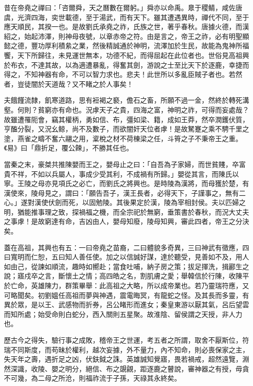 \begin{pinyinscope}
昔在帝堯之禪曰：「咨爾舜，天之曆數在爾躬。」舜亦以命禹。臮于稷鲭，咸佐唐虞，光濟四海，奕世載德，至于湯武，而有天下。雖其遭遇異時，禪代不同，至于應天順民，其揆一也。是故劉氏承堯之祚，氏族之世，著乎春秋。唐據火德，而漢紹之，始起沛澤，則神母夜號，以章赤帝之符。由是言之，帝王之祚，必有明聖顯懿之德，豐功厚利積絫之業，然後精誠通於神明，流澤加於生民，故能為鬼神所福饗，天下所歸往，未見運世無本，功德不紀，而得屈起在此位者也。世俗見高祖興於布衣，不達其故，以為適遭暴亂，得奮其劍，游說之士至比天下於逐鹿，幸捷而得之，不知神器有命，不可以智力求也。悲夫！此世所以多亂臣賊子者也。若然者，豈徒闇於天道哉？又不睹之於人事矣！

夫餓饉流隸，飢寒道路，思有裋褐之褻，儋石之畜，所願不過一金，然終於轉死溝壑。何則？貧窮亦有命也。況虖天子之貴，四海之富，神明之祚，可得而妄處哉？故雖遭罹阨會，竊其權柄，勇如信、布，彊如梁、籍，成如王莽，然卒潤鑊伏質，亨醢分裂，又況幺鲸，尚不及數子，而欲闇奸天位者虖！是故駑蹇之乘不騁千里之塗，燕雀之疇不奮六翮之用，楶梲之材不荷棟梁之任，斗筲之子不秉帝王之重。《易》曰「鼎折足，覆公餗」，不勝其任也。

當秦之末，豪桀共推陳嬰而王之，嬰母止之曰：「自吾為子家婦，而世貧賤，卒富貴不祥，不如以兵屬人，事成少受其利，不成禍有所歸。」嬰從其言，而陳氏以寧。王陵之母亦見項氏之必亡，而劉氏之將興也。是時陵為漢將，而母獲於楚，有漢使來，陵母見之，謂曰：「願告吾子，漢王長者，必得天下，子謹事之，無有二心。」遂對漢使伏劍而死，以固勉陵。其後果定於漢，陵為宰相封侯。夫以匹婦之明，猶能推事理之致，探禍福之機，而全宗祀於無窮，垂策書於春秋，而況大丈夫之事虖！是故窮達有命，吉凶由人，嬰母知廢，陵母知興，審此四者，帝王之分決矣。

蓋在高祖，其興也有五：一曰帝堯之苗裔，二曰體貌多奇異，三曰神武有徵應，四曰寬明而仁恕，五曰知人善任使。加之以信誠好謀，達於聽受，見善如不及，用人如由己，從諫如順流，趣時如嚮赴；當食吐哺，納子房之策；拔足揮洗，揖酈生之說；寤戍卒之言，斷懷土之情；高四皓之名，割肌膚之愛；舉韓信於行陳，收陳平於亡命，英雄陳力，群策畢舉：此高祖之大略，所以成帝業也。若乃靈瑞符應，又可略聞矣。初劉媼任高祖而夢與神遇，震電晦冥，有龍蛇之怪。及其長而多靈，有異於眾，是以王、武感物而折券，呂公睹形而進女；秦皇東游以厭其氣，呂后望雲而知所處；始受命則白蛇分，西入關則五星聚。故淮陰、留侯謂之天授，非人力也。

歷古今之得失，驗行事之成敗，稽帝王之世運，考五者之所謂，取舍不厭斯位，符瑞不同斯度，而苟昧於權利，越次妄據，外不量力，內不知命，則必喪保家之主，失天年之壽，遇折足之凶，伏鈇鉞之誅。英雄誠知覺寤，畏若禍戒，超然遠覽，淵然深識，收陵、嬰之明分，絕信、布之覬覦，距逐鹿之瞽說，審神器之有授，毋貪不可幾，為二母之所沧，則福祚流于子孫，天祿其永終矣。


\end{pinyinscope}
